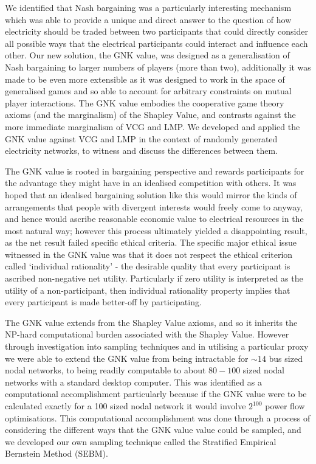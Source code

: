 We identified that Nash bargaining was a particularly interesting mechanism which was able to provide a unique and direct answer to the question of how electricity should be traded between two participants that could directly consider all possible ways that the electrical participants could interact and influence each other.
Our new solution, the GNK value, was designed as a generalisation of Nash bargaining to larger numbers of players (more than two), additionally it was made to be even more extensible as it was designed to work in the space of generalised games and so able to account for arbitrary constraints on mutual player interactions.
The GNK value embodies the cooperative game theory axioms (and the marginalism) of the Shapley Value, and contrasts against the more immediate marginalism of VCG and LMP.
We developed and applied the GNK value against VCG and LMP in the context of randomly generated electricity networks, to witness and discuss the differences between them.

The GNK value is rooted in bargaining perspective and rewards participants for the advantage they might have in an idealised competition with others.
It was hoped that an idealised bargaining solution like this would mirror the kinds of arrangements that people with divergent interests would freely come to anyway, and hence would ascribe reasonable economic value to electrical resources in the most natural way; however this process ultimately yielded a disappointing result, as the net result failed specific ethical criteria.
The specific major ethical issue witnessed in the GNK value was that it does not respect the ethical criterion called `individual rationality' - the desirable quality that every participant is ascribed non-negative net utility.
Particularly if zero utility is interpreted as the utility of a non-participant, then individual rationality property implies that every participant is made better-off by participating.

The GNK value extends from the Shapley Value axioms, and so it inherits the NP-hard computational burden associated with the Shapley Value.
However through investigation into sampling techniques and in utilising a particular proxy we were able to extend the GNK value from being intractable for $\sim 14$ bus sized nodal networks, to being readily computable to about $80-100$ sized nodal networks with a standard desktop computer.
This was identified as a computational accomplishment particularly because if the GNK value were to be calculated exactly for a 100 sized nodal network it would involve $2^{100}$ power flow optimisations.
This computational accomplishment was done through a process of considering the different ways that the GNK value value could be sampled, and we developed our own sampling technique called the Stratified Empirical Bernstein Method (SEBM).

